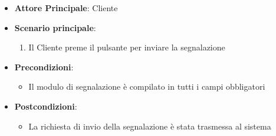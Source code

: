 \label{uc_24.3}
\begin{itemize}
    \item \textbf{Attore Principale}: Cliente
	\item \textbf{Scenario principale}:
	\begin{enumerate}
		\item Il Cliente preme il pulsante per inviare la segnalazione
	\end{enumerate}
	\item \textbf{Precondizioni}:
	\begin{itemize}
		\item Il modulo di segnalazione è compilato in tutti i campi obbligatori
	\end{itemize}
	\item \textbf{Postcondizioni}:
	\begin{itemize}
		\item La richiesta di invio della segnalazione è stata trasmessa al sistema
	\end{itemize}
\end{itemize}